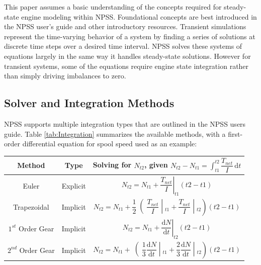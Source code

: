 \documentclass[heading.tex]{subfiles}
\begin{document}
This paper assumes a basic understanding of the concepts required for steady-state engine modeling within NPSS.
Foundational concepts are best introduced in the NPSS user's guide \cite{NPSS} and other introductory resources.
\cite{JonesIntro} 
Transient simulations represent the time-varying behavior of a system by finding a series of
solutions at discrete time steps over a desired time interval. NPSS solves these systems of
equations largely in the same way it handles steady-state solutions. However for transient
systems, some of the equations require engine state integration rather than simply driving imbalances to zero.


\subsection{Solver and Integration Methods}
NPSS supports multiple integration types that are outlined in the NPSS users guide.
\cite[chap.~7.1]{NPSS} Table \ref{tab:Integration} summarizes the available methods, with a 
first-order differential equation for spool speed used as an example: 

\begin{minipage}{\linewidth}
\centering
\bigskip
{} \label{tab:Integration}
\begin{tabular}{|c|c|c|}
\hline 
Method & Type & Solving for  $N_{t2}$, given  $N_{t2}- N_{t1}= \int_{t1}^{t2} \! \dfrac{T_{net}}{I} \, \mathrm{d}t $\\ 
\hline 
Euler & Explicit & $ \left.N_{t2}= N_{t1} + \dfrac{T_{net}}{I} \right|_{t1}^{}(t2-t1)$ \\ 
\hline 
Trapezoidal & Implicit & $ \left.N_{t2}= N_{t1} + \dfrac{1}{2}\middle(\dfrac{T_{net}}{I} \middle|_{t1}^{}+\dfrac{T_{net}}{I} \middle|_{t2}^{}\right)(t2-t1)$ \\ 
\hline 
$1^{st}$ Order Gear & Implicit & $ \left.N_{t2}= N_{t1} + \dfrac{ \mathrm{d}N }{ \mathrm{d}t } \right|_{t2}^{}(t2-t1)$ \\ 
\hline 
$2^{nd}$ Order Gear & Implicit & $ \left.N_{t2}= N_{t1} + \middle(\dfrac{1}{3}\dfrac{ \mathrm{d}N }{ \mathrm{d}t }\middle|_{t1}^{}+\dfrac{2}{3}\dfrac{ \mathrm{d}N }{ \mathrm{d}t }\middle|_{t2}^{}\right)(t2-t1)$ \\ 
\hline 
\end{tabular} 
\end{minipage}

\vspace{5mm} %
\end{document}
